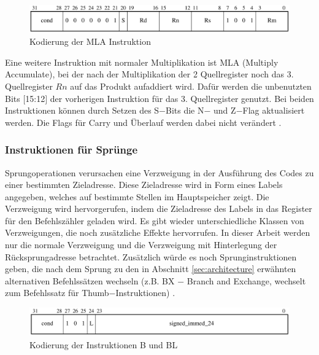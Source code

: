 \documentclass[a4paper, 11pt, onecolumn]{article}
\begin{document}
\begin{figure}[!htb]
\centering
\includegraphics[width=1\textwidth]{data/mla}
\caption{Kodierung der MLA Instruktion \cite{arm:2005}}
\label{fig:mla}
\end{figure}

Eine weitere Instruktion mit normaler Multiplikation ist MLA (Multiply Accumulate), bei der nach der Multiplikation der 2 Quellregister noch das 3. Quellregister $Rn$ auf das Produkt aufaddiert wird. Dafür werden die unbenutzten Bits $[$15:12$]$ der vorherigen Instruktion für das 3. Quellregister genutzt. Bei beiden Instruktionen können durch Setzen des S$-$Bits die N$-$ und Z$-$Flag aktualisiert werden. Die Flags für Carry und Überlauf werden dabei nicht verändert \cite{arm:2005}.

\subsubsection{Instruktionen für Sprünge}

Sprungoperationen verursachen eine Verzweigung in der Ausführung des Codes zu einer bestimmten Zieladresse. Diese Zieladresse wird in Form eines Labels angegeben, welches auf bestimmte Stellen im Hauptspeicher zeigt. Die Verzweigung wird hervorgerufen, indem die Zieladresse des Labels in das Register für den Befehlszähler geladen wird. Es gibt wieder unterschiedliche Klassen von Verzweigungen, die noch zusätzliche Effekte hervorrufen. In dieser Arbeit werden nur die normale Verzweigung und die Verzweigung mit Hinterlegung der Rücksprungadresse betrachtet. Zusätzlich würde es noch Sprunginstruktionen geben, die nach dem Sprung zu den in Abschnitt \ref{sec:architecture} erwähnten alternativen Befehlssätzen wechseln (z.B. BX $-$ Branch and Exchange, wechselt zum Befehlssatz für Thumb$-$Instruktionen) \cite{arm:2005}.

\begin{figure}[!htb]
\centering
\includegraphics[width=1\textwidth]{data/jump}
\caption{Kodierung der Instruktionen B und BL \cite{arm:2005}}
\label{fig:jump}
\end{figure}
\end{document}
